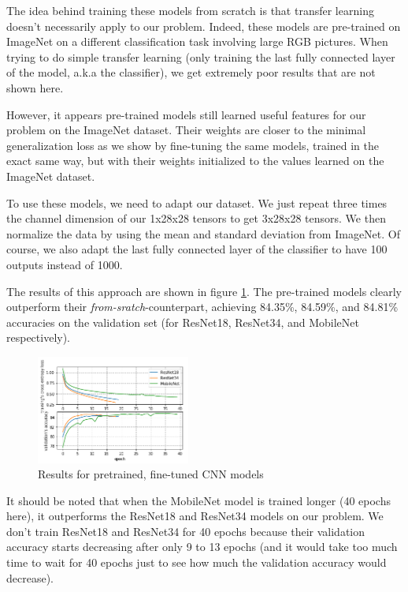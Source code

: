\documentclass[10pt,twocolumn,letterpaper]{article}
\begin{document}
The idea behind training these models from scratch is that transfer learning doesn't necessarily apply to our problem. Indeed, these models are pre-trained on ImageNet on a different classification task involving large RGB pictures. When trying to do simple transfer learning (only training the last fully connected layer of the model, a.k.a the classifier), we get extremely poor results that are not shown here.

However, it appears pre-trained models still learned useful features for our problem on the ImageNet dataset. Their weights are closer to the minimal generalization loss as we show by fine-tuning the same models, trained in the exact same way, but with their weights initialized to the values learned on the ImageNet dataset.

To use these models, we need to adapt our dataset. We just repeat three times the channel dimension of our 1x28x28 tensors to get 3x28x28 tensors. We then normalize the data by using the mean and standard deviation from ImageNet. Of course, we also adapt the last fully connected layer of the classifier to have 100 outputs instead of 1000.

The results of this approach are shown in figure \ref{fig:cnn_pretrained}. The pre-trained models clearly outperform their \textit{from-sratch}-counterpart, achieving 84.35\%, 84.59\%, and 84.81\% accuracies on the validation set (for ResNet18, ResNet34, and MobileNet respectively).

\begin{figure}[h] 
\centering
\includegraphics[width=0.45\textwidth]{images/cnn_pretrained_results.png}
\caption{Results for pretrained, fine-tuned CNN models}
\label{fig:cnn_pretrained}
\end{figure}

It should be noted that when the MobileNet model is trained longer (40 epochs here), it outperforms the ResNet18 and ResNet34 models on our problem. We don't train ResNet18 and ResNet34 for 40 epochs because their validation accuracy starts decreasing after only 9 to 13 epochs (and it would take too much time to wait for 40 epochs just to see how much the validation accuracy would decrease).
\end{document}
